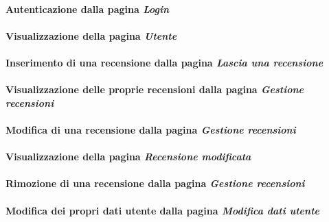 \paragraph{Autenticazione dalla pagina \textit{Login}}
\label{analisi-casi-uso-attori-principali-utente-autenticato-1}

\paragraph{Visualizzazione della pagina \textit{Utente}}
\label{analisi-casi-uso-attori-principali-utente-autenticato-2}

\paragraph{Inserimento di una recensione dalla pagina \textit{Lascia una recensione}}
\label{analisi-casi-uso-attori-principali-utente-autenticato-3}

\paragraph{Visualizzazione delle proprie recensioni dalla pagina \textit{Gestione recensioni}}
\label{analisi-casi-uso-attori-principali-utente-autenticato-4}

\paragraph{Modifica di una recensione dalla pagina \textit{Gestione recensioni}}
\label{analisi-casi-uso-attori-principali-utente-autenticato-5}

\paragraph{Visualizzazione della pagina \textit{Recensione modificata}}
\label{analisi-casi-uso-attori-principali-utente-autenticato-6}

\paragraph{Rimozione di una recensione dalla pagina \textit{Gestione recensioni}}
\label{analisi-casi-uso-attori-principali-utente-autenticato-7}

\paragraph{Modifica dei propri dati utente dalla pagina \textit{Modifica dati utente}}
\label{analisi-casi-uso-attori-principali-utente-autenticato-8}

